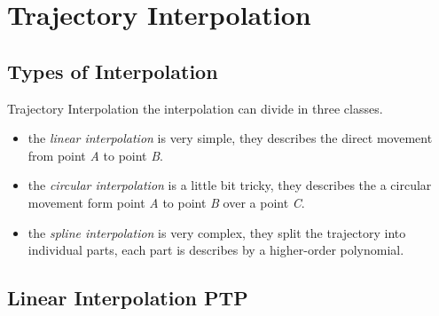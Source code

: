\documentclass[%
  professionalfonts,%
  xcolor={%
    usenames,%
    dvipsnames,%
    svgnames,%
    table,%
    hyperref%
  }%
]{beamer}
\begin{document}
\section{Trajectory Interpolation}
\subsection{Types of Interpolation}
\begin{frame}{Trajectory Interpolation}
the interpolation can divide in three classes.
\begin{itemize}
\item the \emph{linear interpolation} is very simple, they describes the direct movement from point \emph{A} to point \emph{B}.
\item the \emph{circular interpolation} is a little bit tricky, they describes the a circular movement form point \emph{A} to point \emph{B} over a point \emph{C}.
\item the \emph{spline interpolation} is very complex, they split the trajectory into individual parts, each part is describes by a higher-order polynomial.
\end{itemize}
\end{frame}

\subsection{Linear Interpolation PTP}
%

\end{document}
